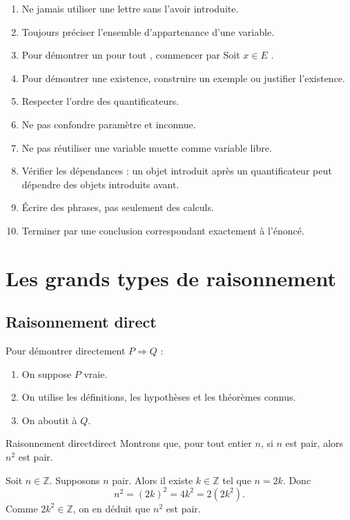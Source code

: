 \documentclass[11pt,a4paper]{article}
\newcommand{\Z}{\mathbb{Z}}
\begin{document}
\begin{retenirbox}
\begin{enumerate}
    \item Ne jamais utiliser une lettre sans l'avoir introduite.
    \item Toujours préciser l'ensemble d'appartenance d'une variable.
    \item Pour démontrer un \og pour tout \fg{}, commencer par \og Soit $x\in E$ \fg{}.
    \item Pour démontrer une existence, construire un exemple ou justifier l'existence.
    \item Respecter l'ordre des quantificateurs.
    \item Ne pas confondre paramètre et inconnue.
    \item Ne pas réutiliser une variable muette comme variable libre.
    \item Vérifier les dépendances : un objet introduit après un quantificateur peut dépendre des objets introduits avant.
    \item Écrire des phrases, pas seulement des calculs.
    \item Terminer par une conclusion correspondant exactement à l'énoncé.
\end{enumerate}
\end{retenirbox}
\section{Les grands types de raisonnement}

\subsection{Raisonnement direct}

\begin{methodebox}
Pour démontrer directement $P\Rightarrow Q$ :
\begin{enumerate}
  \item On suppose $P$ vraie.
  \item On utilise les définitions, les hypothèses et les théorèmes connus.
  \item On aboutit à $Q$.
\end{enumerate}
\end{methodebox}

\begin{exemplebox}{Raisonnement direct}{direct}
Montrons que, pour tout entier $n$, si $n$ est pair, alors $n^2$ est pair.

Soit $n\in\Z$. Supposons $n$ pair. Alors il existe $k\in\Z$ tel que $n=2k$. Donc
\[
n^2=(2k)^2=4k^2=2(2k^2).
\]
Comme $2k^2\in\Z$, on en déduit que $n^2$ est pair.
\end{exemplebox}
\end{document}
